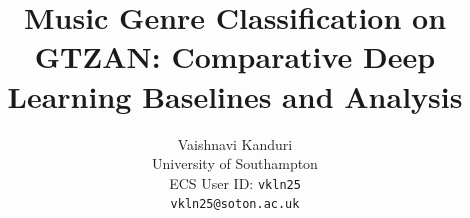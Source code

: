 \documentclass[10pt,twocolumn,letterpaper]{article}
\title{Music Genre Classification on GTZAN:
Comparative Deep Learning Baselines and Analysis}
\author{Vaishnavi Kanduri\\
University of Southampton\\
ECS User ID: \texttt{vkln25}\\
\texttt{vkln25@soton.ac.uk}
}
\begin{document}
\maketitle
    




{
    \small
    
    
}
\end{document}
